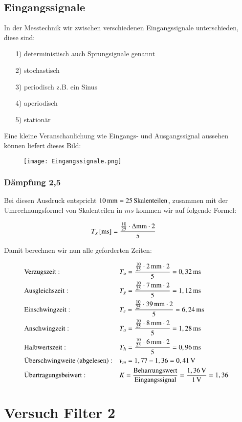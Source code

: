 \subsection{Eingangssignale}

In der Messtechnik wir zwischen verschiedenen Eingangssignale unterschieden, diese sind:

\begin{itemize}
\item[1)] deterministisch auch Sprungsignale genannt
\item[2)] stochastisch
\item[3)] periodisch z.B. ein Sinus
\item[4)] aperiodisch
\item[5)] stationär
\end{itemize}

Eine kleine Veranschaulichung wie Eingangs- und Ausgangssignal aussehen können liefert dieses Bild:

\begin{figure}[h]
\centering
\texttt{[image: Eingangssignale.png]}
\end{figure}


\subsubsection*{Dämpfung 2,5}

Bei diesen Ausdruck entspricht $\unit[10]{mm} = \unit[25]{Skalenteilen}$, zusammen mit der Umrechnungsformel von Skalenteilen in $ms$ kommen wir auf folgende Formel:

\begin{align*}
\unit[T_x]{[ms]} &= \frac{ \frac{10}{25} \cdot \Delta \text{mm} \cdot 2}{5}
\end{align*}

Damit berechnen wir nun alle geforderten Zeiten:

\begin{align*}
&\text{Verzugszeit}:  &&T_u = \frac{ \frac{10}{25} \cdot \unit[2]{mm} \cdot 2}{5} = \unit[0,32]{ms} \\
&\text{Ausgleichszeit}:  &&T_g = \frac{ \frac{10}{25} \cdot \unit[7]{mm} \cdot 2}{5} = \unit[1,12]{ms} \\
&\text{Einschwingzeit}:  &&T_e = \frac{ \frac{10}{25} \cdot \unit[39]{mm} \cdot 2}{5} = \unit[6,24]{ms} \\
&\text{Anschwingzeit}:  &&T_a = \frac{ \frac{10}{25} \cdot \unit[8]{mm} \cdot 2}{5} = \unit[1,28]{ms} \\
&\text{Halbwertszeit}:  &&T_h = \frac{ \frac{10}{25} \cdot \unit[6]{mm} \cdot 2}{5} = \unit[0,96]{ms} \\
&\text{Überschwingweite (abgelesen)}:  &&v_m = 1,77 - 1,36 = \unit[0,41]{V} \\
&\text{Übertragungsbeiwert}:  &&K = \frac{\text{Beharrungswert}}{\text{Eingangssignal}} = \frac{\unit[1,36]{V}}{\unit[1]{V}} = \unit[1,36]{ } \\
\end{align*}
\section{Versuch Filter 2}





